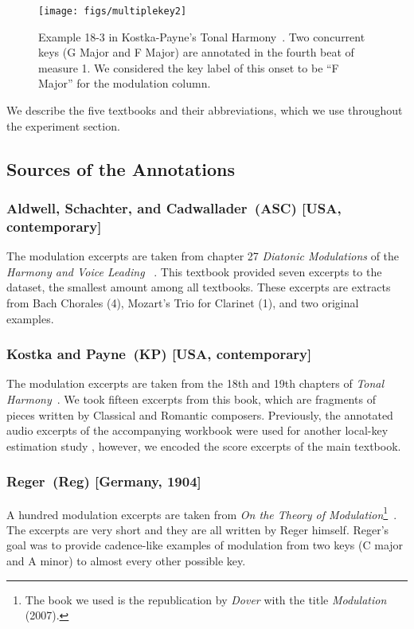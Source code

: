 \documentclass[sigconf]{acmart}
\begin{document}
\begin{figure}[h]
  \centering
  \texttt{[image: figs/multiplekey2]}
  \caption{Example 18-3 in Kostka-Payne's Tonal Harmony~\cite{kostka2008tonal}. Two concurrent keys (G Major and F Major) are annotated in the fourth beat of measure 1. We considered the key label of this onset to be ``F Major'' for the modulation column.}
  \label{fig:multiplekeys}
\end{figure}

We describe the five textbooks and their abbreviations, which we use throughout the experiment section.

\subsection{Sources of the Annotations}

	\subsubsection{Aldwell, Schachter, and Cadwallader~(ASC) [USA, contemporary]}
	The modulation excerpts are taken from chapter 27 \emph{Diatonic Modulations} of the \emph{Harmony and Voice Leading} ~\cite{aldwell2018harmony}.
	This textbook provided seven excerpts to the dataset, the smallest amount among all textbooks. 
	These excerpts are extracts from Bach Chorales (4), Mozart's Trio for Clarinet (1), and two original examples.  
	
	\subsubsection{Kostka and Payne~(KP) [USA, contemporary]}
	The modulation excerpts are taken from the 18th and 19th chapters of \emph{Tonal Harmony}~\cite{kostka2008tonal}. 
	We took fifteen excerpts from this book, which are fragments of pieces written by Classical and Romantic composers. 
	Previously, the annotated audio excerpts of the accompanying workbook were used for another local-key estimation study \cite{izmirli2007localized}, however, we encoded the score excerpts of the main textbook.
	
	\subsubsection{Reger~(Reg) [Germany, 1904]}
	A hundred modulation excerpts are taken from \emph{On the Theory of Modulation}\footnote{The book we used is the republication by \emph{Dover} with the title \emph{Modulation} (2007).}~\cite{regermodulation}. 
	The excerpts are very short and they are all written by Reger himself. 
	Reger's goal was to provide cadence-like examples of modulation from two keys (C major and A minor) to almost every other possible key. 
	
\end{document}
